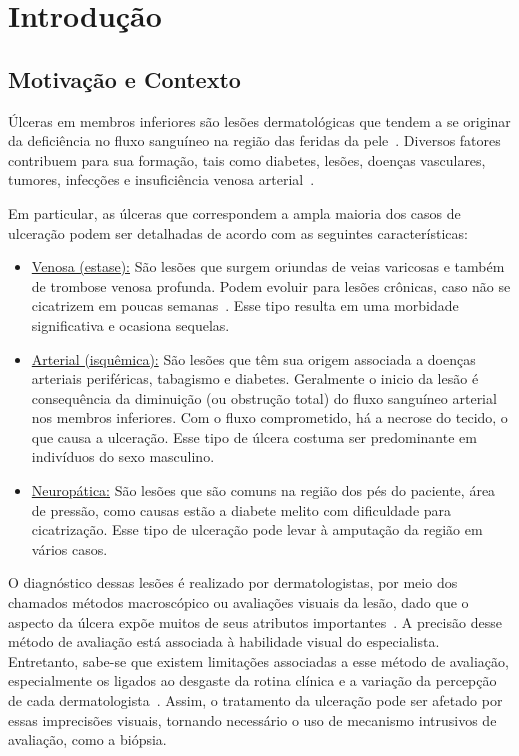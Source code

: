 \section{Introdução}

\subsection{Motivação e Contexto}

Úlceras em membros inferiores são lesões dermatológicas que tendem a se originar da deficiência no fluxo sanguíneo na região das feridas da pele~\cite{Pereira2011}.
Diversos fatores contribuem para sua formação, tais como diabetes, lesões, doenças vasculares, tumores, infecções e insuficiência venosa arterial~\cite{Ramelet2001}.


Em particular, as úlceras que correspondem a ampla maioria dos casos de ulceração podem ser detalhadas de acordo com as seguintes características:

\begin{itemize}
\item \underline{Venosa (estase):} São lesões que surgem oriundas de veias varicosas e também de trombose venosa profunda. 
Podem evoluir para lesões crônicas, caso não se cicatrizem em poucas semanas~\cite{Abbade2005}.
Esse tipo resulta em uma morbidade significativa e ocasiona sequelas.

\item \underline{Arterial (isquêmica):} São lesões que têm sua origem associada a doenças arteriais periféricas, tabagismo e diabetes.
Geralmente o inicio da lesão é consequência da diminuição (ou obstrução total) do fluxo sanguíneo arterial nos membros inferiores.
Com o fluxo comprometido, há a necrose do tecido, o que causa a ulceração.
Esse tipo de úlcera costuma ser predominante em indivíduos do sexo masculino.

\item \underline{Neuropática:} São lesões que são comuns na região dos pés do paciente, área de pressão, como causas estão a diabete melito com dificuldade para cicatrização. 
Esse tipo de ulceração pode levar à amputação da região em vários casos.
\end{itemize}

O diagnóstico dessas lesões é realizado por dermatologistas, por meio dos chamados métodos macroscópico ou avaliações visuais da lesão, dado que o aspecto da úlcera expõe muitos de seus atributos importantes~\cite{Pereira2011}.
A precisão desse método de avaliação está associada à habilidade visual do especialista.
Entretanto, sabe-se que existem limitações associadas a esse método de avaliação, especialmente os ligados ao desgaste da rotina clínica e a variação da percepção de cada dermatologista~\cite{Maglogiannis2005}. 
Assim, o tratamento da ulceração pode ser afetado por essas imprecisões visuais, tornando necessário o uso de mecanismo intrusivos de avaliação, como a biópsia.

